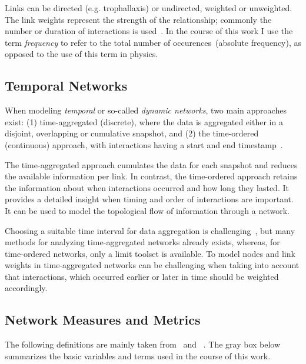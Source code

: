 Links can be directed (e.g. trophallaxis) or undirected, weighted or unweighted. The link weights represent the strength of the relationship; commonly the number or duration of interactions is used~\cite{farine2015constructing}.
In the course of this work I use the term \emph{frequency} to refer to the total number of occurences~(absolute frequency), as opposed to the use of this term in physics. 



\subsection{Temporal Networks}
When modeling \emph{temporal} or so-called \emph{dynamic networks}, two main approaches exist: (1) time-aggregated (discrete), where the data is aggregated either in a disjoint, overlapping or cumulative snapshot, and (2) the time-ordered (continuous) approach, with interactions having a start and end timestamp~\cite{moody2005dynamic, Pinter-Wollman2014, blonder2012temporal}.

The time-aggregated approach cumulates the data for each snapshot and reduces the available information per link.
In contrast, the time-ordered approach retains the information about when interactions occurred and how long they lasted.
It provides a detailed insight when timing and order of interactions are important.
It can be used to model the topological flow of information through a network.

Choosing a suitable time interval for data aggregation is challenging~\cite{Pinter-Wollman2014}, but many methods for analyzing time-aggregated networks already exists, whereas, for time-ordered networks, only a limit toolset is available. To model nodes and link weights in time-aggregated networks can be challenging when taking into account that interactions, which occurred earlier or later in time should be weighted accordingly.

\subsection{Network Measures and Metrics}
\label{sec:definitions}
The following definitions are mainly taken from~\textcite{barabasi2016network} and ~\textcite{newman2010networks}. The gray box below summarizes the basic variables and terms used in the course of this work.\\

